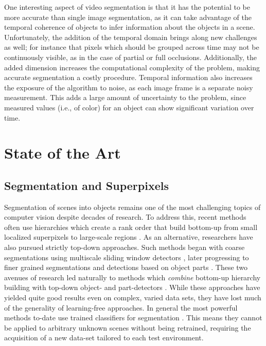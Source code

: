 One interesting aspect of video segmentation is that it has the potential to be more accurate than single image segmentation, as it can take advantage of the temporal coherence of objects to infer information about the objects in a scene. Unfortunately, the addition of the temporal domain brings along new challenges as well; for instance that pixels which should be grouped across time may not be continuously visible, as in the case of partial or full occlusions. Additionally, the added dimension increases the computational complexity of the problem, making accurate segmentation a costly procedure. Temporal information also increases the exposure of the algorithm to noise, as each image frame is a separate noisy measurement. This adds a large amount of uncertainty to the problem, since measured values (i.e., of color) for an object can show significant variation over time. 
 
\section{State of the Art}
\subsection{Segmentation and Superpixels}
Segmentation of scenes into objects remains one of the most challenging topics of computer vision despite decades of research. To address this, recent methods often use hierarchies which create a rank order that build bottom-up from small localized superpixels to large-scale regions \cite{Ren:ICCV2003,Ahuja:CVPR2008,Arbelaez:PAMI2011}. As an alternative, researchers have also pursued strictly top-down approaches. Such methods began with coarse segmentations using multiscale sliding window detectors \cite{ViolaJones:IJCV2004}, later progressing to finer grained segmentations and detections based on object parts \cite{Felzenswalb:PAMI2010, Bourdev:ICCV2009}. These two avenues of research led naturally to methods which {\em combine} bottom-up hierarchy building with top-down object- and part-detectors \cite{Arbelaez:CVPR2012, Silberman:ECCV12, Gupta:CVPR2013}. While these approaches have yielded quite good results even on complex, varied data sets, they have lost much of the generality of learning-free approaches. In general the most powerful methods to-date use trained classifiers for segmentation \cite{Silberman:ECCV12, Gupta:CVPR2013}. This means they cannot be applied to arbitrary unknown scenes without being retrained, requiring the acquisition of a new data-set tailored to each test environment.

